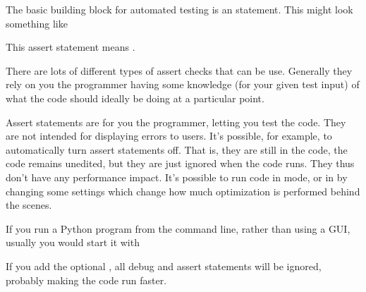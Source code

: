 \documentclass[letterpaper,10pt,british]{sphinxmanual}
\begin{document}
\sphinxAtStartPar
The basic building block for automated testing is an  statement. This might look something like

\begin{sphinxVerbatim}[commandchars=\\\{\}]
   
\end{sphinxVerbatim}

\sphinxAtStartPar
This assert statement means .

\sphinxAtStartPar
There are lots of different types of assert checks that can be use. Generally they rely on you the programmer having some knowledge (for your given test input) of what the code should ideally be doing at a particular point.

\sphinxAtStartPar
Assert statements are for you the programmer, letting you test the code. They are not intended for displaying errors to users. It’s possible, for example, to automatically turn assert statements off. That is, they are still in the code, the code remains unedited, but they are just ignored when the code runs. They thus don’t have any performance impact. It’s possible to run code in  mode, or in  by changing some settings which change how much optimization is performed behind the scenes.

\sphinxAtStartPar
If you run a Python program  from the command line, rather than using a GUI, usually you would start it with

\begin{sphinxVerbatim}[commandchars=\\\{\}]
\end{sphinxVerbatim}

\sphinxAtStartPar
If you add the optional , all debug and assert statements will be ignored, probably making the code run faster.

\begin{sphinxVerbatim}[commandchars=\\\{\}]
\end{sphinxVerbatim}
\end{document}
